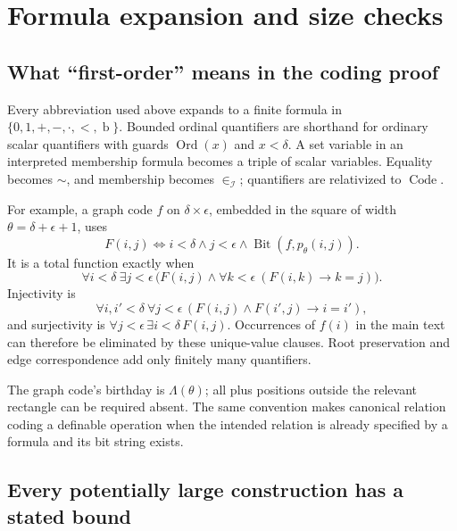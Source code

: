 \documentclass[11pt,letterpaper]{article}
\theoremstyle{definition}
\theoremstyle{remark}
\newcommand{\Ord}{\operatorname{Ord}}
\newcommand{\bd}{\operatorname{b}}
\newcommand{\I}{\mathcal I}
\newcommand{\Code}{\operatorname{Code}}
\newcommand{\Bit}{\operatorname{Bit}}
\begin{document}
\appendix
\section{Formula expansion and size checks}
\label{app:formulas}

\subsection{What ``first-order'' means in the coding proof}

Every abbreviation used above expands to a finite formula in
$\{0,1,+,-,\cdot,<,\bd\}$. Bounded ordinal quantifiers are shorthand for
ordinary scalar quantifiers with guards $\Ord(x)$ and $x<\delta$.
A set variable in an interpreted membership formula becomes a triple of
scalar variables. Equality becomes $\sim$, and membership becomes
$\in_\I$; quantifiers are relativized to $\Code$.

For example, a graph code $f$ on $\delta\times\epsilon$, embedded in the
square of width $\theta=\delta+\epsilon+1$, uses
\[
 F(i,j)\iff i<\delta\land j<\epsilon\land
                 \Bit(f,p_\theta(i,j)).
\]
It is a total function exactly when
\[
 \forall i<\delta\ \exists j<\epsilon\,
 \bigl(F(i,j)\land\forall k<\epsilon\ (F(i,k)\longrightarrow k=j)\bigr).
\]
Injectivity is
\[
 \forall i,i'<\delta\ \forall j<\epsilon\,
       (F(i,j)\land F(i',j)\longrightarrow i=i'),
\]
and surjectivity is $\forall j<\epsilon\,\exists i<\delta\,F(i,j)$.
Occurrences of $f(i)$ in the main text can therefore be eliminated by these
unique-value clauses. Root preservation and edge correspondence add only
finitely many quantifiers.

The graph code's birthday is $\Lambda(\theta)$; all plus positions outside
the relevant rectangle can be required absent. The same convention makes
canonical relation coding a definable operation when the intended relation
is already specified by a formula and its bit string exists.

\subsection{Every potentially large construction has a stated bound}
\end{document}
